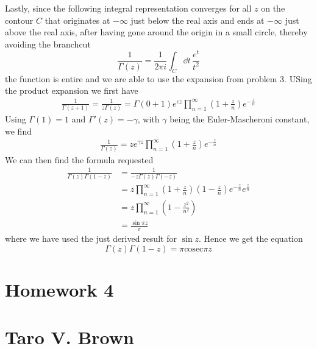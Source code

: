 \documentclass[a4paper,12pt]{article}
\begin{document}
Lastly, since the following integral representation converges for all $z$ on the contour $C$ that originates at $-\infty$ just below the real axis and ends at $-\infty$ just above the real axis, after having gone around the origin in a small circle, thereby avoiding the branchcut
\begin{equation}
\frac{1}{\Gamma(z)}=\frac{1}{2\pi i}\int_C\dd t\, \frac{e^t}{t^2}
\end{equation}
the function is entire and we are able to use the expansion from problem 3. USing the product expansion we first have
\begin{equation}
\begin{aligned}
\frac{1}{\Gamma(z+1)}=\frac{1}{z\Gamma(z)}=\Gamma(0+1)e^{cz}\prod_{n=1}^{\infty}\left(1+\frac{z}{n}\right)e^{-\frac{z}{n}}
\end{aligned}
\end{equation}
Using $\Gamma(1)=1$ and $\Gamma'(z)=-\gamma$, with $\gamma $ being the Euler-Mascheroni constant, we find
\begin{equation}
	\begin{aligned}
\frac{1}{\Gamma(z)}=ze^{\gamma z}\prod_{n=1}^{\infty}\left(1+\frac{z}{n}\right)e^{-\frac{z}{n}}
	\end{aligned}
\end{equation}
We can then find the formula requested
\begin{equation}
\begin{aligned}
\frac{1}{\Gamma(z)\Gamma(1-z)}&=
\frac{1}{-z\Gamma(z)\Gamma(-z)}\\
&=z\prod_{n=1}^{\infty}\left(1+\frac{z}{n}\right)\left(1-\frac{z}{n}\right)e^{-\frac{z}{n}}e^{\frac{z}{n}}\\
&=z\prod_{n=1}^{\infty}\left(1-\frac{z^2}{n^2}\right)\\
&=\frac{\sin \pi z}{\pi}
\end{aligned}
\end{equation}
where we have used the just derived result for $\sin z$. Hence we get the equation
\begin{equation}
\Gamma(z)\Gamma(1-z)=\pi\text{cosec} \pi z
\end{equation}
\newpage
\section*{Homework 4\\\\
	Taro V. Brown}\vspace*{1cm}
\end{document}
